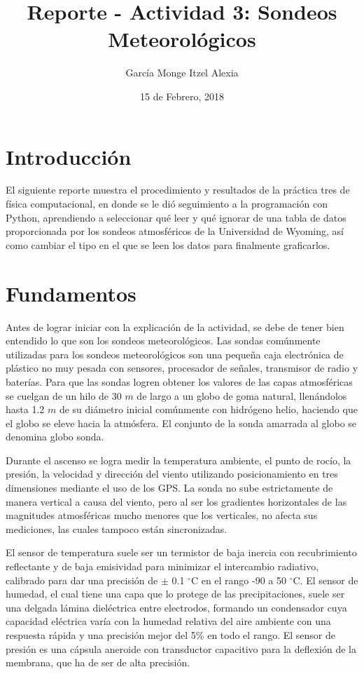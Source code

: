 \documentclass{article}
\title{Reporte - Actividad 3: Sondeos Meteorológicos}
\author{García Monge Itzel Alexia}
\date{15 de Febrero, 2018}
\begin{document}
\maketitle
\section{Introducción}
El siguiente reporte muestra el procedimiento y resultados de la práctica tres de física computacional, en donde se le dió seguimiento a la programación con Python, aprendiendo a seleccionar qué leer y qué ignorar de una tabla de datos proporcionada por los sondeos atmosféricos de la Universidad de Wyoming, así como cambiar el tipo en el que se leen los datos para finalmente graficarlos.

\section{Fundamentos}
Antes de lograr iniciar con la explicación de la actividad, se debe de tener bien entendido lo que son los sondeos meteorológicos. Las sondas comúnmente utilizadas para los sondeos meteorológicos son una pequeña caja electrónica de plástico no muy pesada con sensores, procesador de señales, transmisor de radio y baterías. Para que las sondas logren obtener los valores de las capas atmosféricas se cuelgan de un hilo de 30 $m$ de largo a un globo de goma natural, llenándolos hasta 1.2 $m$ de su diámetro inicial comúnmente con hidrógeno  helio, haciendo que el globo se eleve hacia la atmósfera. El conjunto de la sonda amarrada al globo se denomina globo sonda.

	Durante el ascenso se logra medir la temperatura ambiente, el punto de rocío, la presión, la velocidad y dirección del viento utilizando posicionamiento en tres dimensiones mediante el uso de los GPS. La sonda no sube estrictamente de manera vertical a causa del viento, pero al ser los gradientes horizontales de
las magnitudes atmosféricas mucho menores que los verticales, no afecta sus mediciones, las cuales tampoco están sincronizadas.

	El sensor de temperatura suele ser un termistor de baja inercia con recubrimiento reflectante y de baja emisividad para minimizar el intercambio radiativo, calibrado para dar una precisión de $\pm$ 0.1 $^\circ$C en el rango -90 a 50 $^\circ$C. El sensor de humedad, el cual tiene una capa que lo protege de las precipitaciones, suele ser una delgada lámina dieléctrica entre electrodos, formando un condensador cuya capacidad eléctrica varía con la humedad relativa del aire ambiente con una respuesta rápida y una precisión mejor del 5\% en todo el rango. El sensor de presión es una cápsula aneroide con transductor capacitivo para la deflexión de la membrana, que ha de ser de alta precisión.
    
\end{document}

